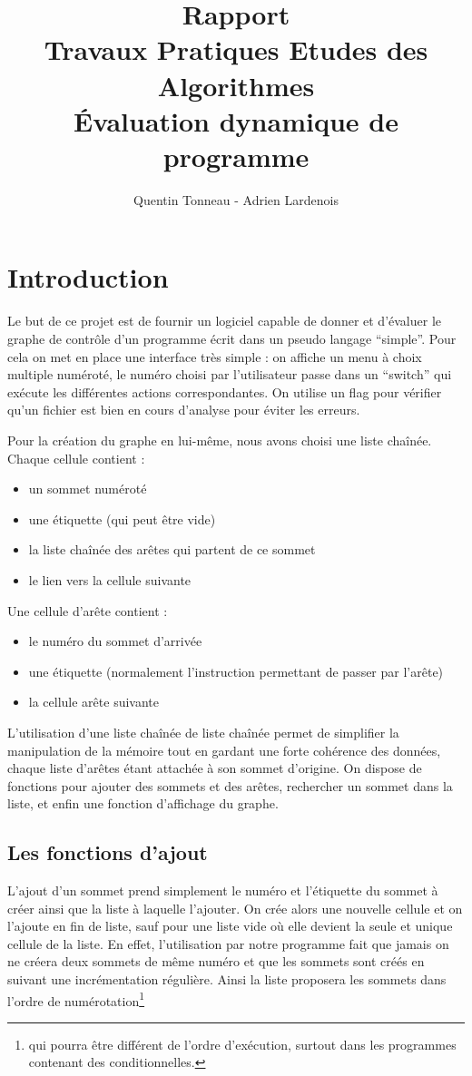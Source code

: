 \documentclass[a4paper,11pt]{article}
\title {Rapport \\ Travaux Pratiques Etudes des Algorithmes \\ Évaluation dynamique de programme}
\author {Quentin Tonneau - Adrien Lardenois}
\date{}
\begin{document}
	\maketitle %
	\tableofcontents %
	\newpage %
	
	
	\section{Introduction}
	Le but de ce projet est de fournir un logiciel capable de donner et d'évaluer le graphe de contrôle d'un programme écrit dans un pseudo langage ``simple''. Pour cela on met en place une interface très simple : on affiche un menu à choix multiple numéroté, le numéro choisi par l'utilisateur passe dans un ``switch'' qui exécute les différentes actions correspondantes. On utilise un flag pour vérifier qu'un fichier est bien en cours d'analyse pour éviter les erreurs.

	Pour la création du graphe en lui-même, nous avons  choisi une liste chaînée. Chaque cellule contient :
	\begin{itemize}
		\item un sommet numéroté
		\item une étiquette (qui peut être vide)
		\item la liste chaînée des arêtes qui partent de ce sommet
		\item le lien vers la cellule suivante
	\end{itemize}
	Une cellule d'arête contient : 
	\begin{itemize}
		\item le numéro du sommet d'arrivée 
		\item une étiquette (normalement l'instruction permettant de passer par l'arête)
		\item la cellule arête suivante
	\end{itemize}
	
	L'utilisation d'une liste chaînée de liste chaînée permet de simplifier la manipulation de la mémoire tout en gardant une forte cohérence des données, chaque liste d'arêtes étant attachée à son sommet d'origine. On dispose de fonctions pour ajouter des sommets et des arêtes, rechercher un sommet dans la liste, et enfin une fonction d'affichage du graphe.
	\subsection{Les fonctions d'ajout}
		L'ajout d'un sommet prend simplement le numéro et l'étiquette du sommet à créer ainsi que la liste à laquelle l'ajouter. On crée alors une nouvelle cellule et on l'ajoute en fin de liste, sauf pour une liste vide où elle devient la seule et unique cellule de la liste. En effet, l'utilisation par notre programme fait que jamais on ne créera deux sommets de même numéro et que les sommets sont créés en suivant une incrémentation régulière. Ainsi la liste proposera les sommets dans l'ordre de numérotation\footnote{qui pourra être différent de l'ordre d'exécution, surtout dans les programmes contenant des conditionnelles.}
\end{document}
